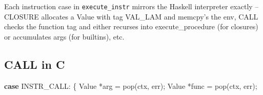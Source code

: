 \documentclass[]{article}
\newenvironment{Shaded}{}{}
\newcommand{\ControlFlowTok}[1]{\textcolor[rgb]{0.00,0.44,0.13}{\textbf{#1}}}
\newcommand{\NormalTok}[1]{#1}
\newcommand{\OperatorTok}[1]{\textcolor[rgb]{0.40,0.40,0.40}{#1}}
\begin{document}
Each instruction case in \texttt{execute\_instr} mirrors the Haskell interpreter
exactly -- CLOSURE allocates a Value with tag VAL\_LAM and memcpy's the env,
CALL checks the function tag and either recurses into execute\_procedure (for
closures) or accumulates args (for builtins), etc.

\subsection{CALL in C}\label{call-in-c}

\begin{Shaded}
\begin{Highlighting}[]
\ControlFlowTok{case}\NormalTok{ INSTR\_CALL}\OperatorTok{:} \OperatorTok{\{}
\NormalTok{    Value }\OperatorTok{*}\NormalTok{arg }\OperatorTok{=}\NormalTok{ pop}\OperatorTok{(}\NormalTok{ctx}\OperatorTok{,}\NormalTok{ err}\OperatorTok{);}
\NormalTok{    Value }\OperatorTok{*}\NormalTok{func }\OperatorTok{=}\NormalTok{ pop}\OperatorTok{(}\NormalTok{ctx}\OperatorTok{,}\NormalTok{ err}\OperatorTok{);}


\end{Highlighting}
\end{Shaded}
\end{document}
